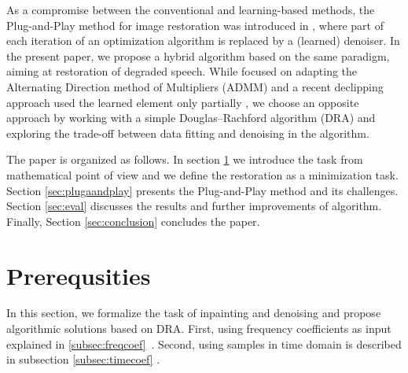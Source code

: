 \documentclass[conference]{IEEEtran}
\newcommand{\todo}[1]{\textcolor{red}{#1}}
\begin{document}
As a compromise between the conventional and learning-based methods, 
the Plug-and-Play method for image restoration was introduced in \cite{Chan2016},
where part of each iteration of an optimization algorithm is replaced by a (learned) denoiser.
In the present paper, we propose a hybrid algorithm based on the same paradigm, aiming at restoration of degraded speech.
While \cite{Chan2016} focused on adapting the Alternating Direction method of Multipliers (ADMM) and a recent declipping approach used the learned element only partially \cite{Tanaka2022}, we choose an opposite approach by working with a simple Douglas--Rachford algorithm (DRA) and exploring the trade-off between data fitting and denoising in the algorithm.



The paper is organized as follows. In section \ref{sec:prereq} we introduce the task from mathematical point of view and we define the restoration as a minimization task.
Section \ref{sec:plugaandplay} presents the Plug-and-Play method and its challenges.
Section \ref{sec:eval} discusses the results and further improvements of algorithm.
Finally, Section \ref{sec:conclusion} concludes the paper.

\section{Prerequsities}\label{sec:prereq} 


In this section, we formalize the task of inpainting and denoising and propose algorithmic solutions based on DRA.
First, using frequency coefficients as input explained in \ref{subsec:freqcoef}~\cite{Mokry2020}.
Second, using samples in time domain is described in subsection \ref{subsec:timecoef} \cite{Mokry2021}.
\end{document}
